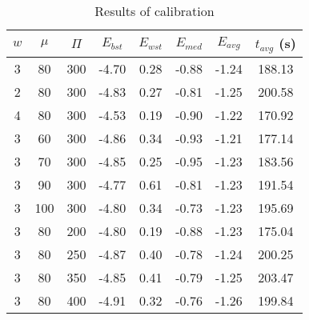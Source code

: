 \begin{table}[H]
\centering
\begin{tabular}{@{}cccccccc@{}}
\toprule
$w$ & $\mu$ & $\Pi$ & $E_{bst}$ & $E_{wst}$ & $E_{med}$ & $E_{avg}$ & $t_{avg}$ (s) \\ \midrule
3 & 80 & 300 & -4.70 & 0.28 & -0.88 & -1.24 & 188.13 \\
2 & 80 & 300 & -4.83 & 0.27 & -0.81 & -1.25 & 200.58 \\
4 & 80 & 300 & -4.53 & 0.19 & -0.90 & -1.22 & 170.92 \\
3 & 60 & 300 & -4.86 & 0.34 & -0.93 & -1.21 & 177.14 \\
3 & 70 & 300 & -4.85 & 0.25 & -0.95 & -1.23 & 183.56 \\
3 & 90 & 300 & -4.77 & 0.61 & -0.81 & -1.23 & 191.54 \\
3 & 100 & 300 & -4.80 & 0.34 & -0.73 & -1.23 & 195.69 \\
3 & 80 & 200 & -4.80 & 0.19 & -0.88 & -1.23 & 175.04 \\
3 & 80 & 250 & -4.87 & 0.40 & -0.78 & -1.24 & 200.25 \\
3 & 80 & 350 & -4.85 & 0.41 & -0.79 & -1.25 & 203.47 \\
3 & 80 & 400 & -4.91 & 0.32 & -0.76 & -1.26 & 199.84 \\ \bottomrule
\end{tabular}
\caption{Results of calibration}
\label{calibration-results}
\end{table}